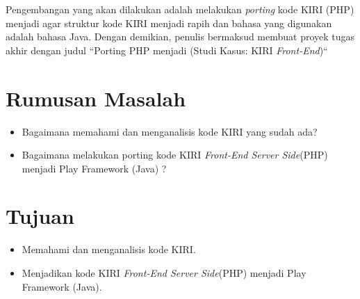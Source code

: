 Pengembangan yang akan dilakukan adalah melakukan \textit{porting} kode KIRI (PHP) menjadi \play agar struktur kode KIRI menjadi rapih dan bahasa yang digunakan adalah bahasa Java. Dengan demikian, penulis bermaksud membuat proyek tugas akhir dengan judul ``Porting PHP menjadi \play (Studi Kasus: KIRI \textit{Front-End})``

%
%
%

\section{Rumusan Masalah}
\label{rumusanMasalah}
\begin{itemize}
	\item Bagaimana memahami dan menganalisis kode KIRI yang sudah ada?
	\item Bagaimana melakukan porting kode KIRI \textit{Front-End Server Side}(PHP) menjadi Play Framework (Java) ?
\end{itemize}

\section{Tujuan}
\label{sec:tujuan}
\begin{itemize}
	\item Memahami dan menganalisis kode KIRI.
	\item Menjadikan kode KIRI \textit{Front-End Server Side}(PHP) menjadi Play Framework (Java).
\end{itemize}

